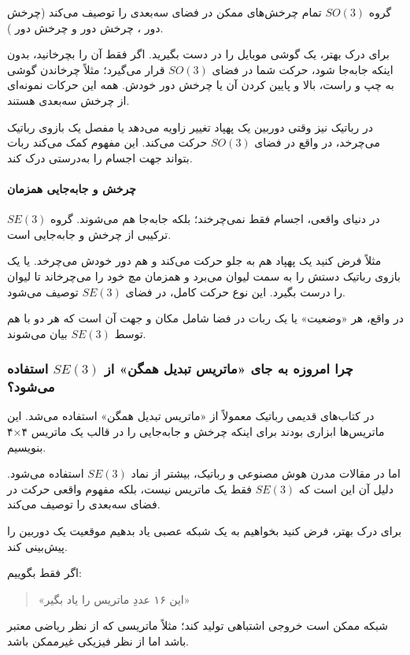 \documentclass{article}
\begin{document}
گروه $SO(3)$ تمام چرخش‌های ممکن در فضای سه‌بعدی را توصیف می‌کند (چرخش دور ، چرخش دور  و چرخش دور ).

برای درک بهتر، یک گوشی موبایل را در دست بگیرید. اگر فقط آن را بچرخانید، بدون اینکه جابه‌جا شود، حرکت شما در فضای $SO(3)$ قرار می‌گیرد؛ مثلاً چرخاندن گوشی به چپ و راست، بالا و پایین کردن آن یا چرخش دور خودش. همه این حرکات نمونه‌ای از چرخش سه‌بعدی هستند.

در رباتیک نیز وقتی دوربین یک پهپاد تغییر زاویه می‌دهد یا مفصل یک بازوی رباتیک می‌چرخد، در واقع در فضای $SO(3)$ حرکت می‌کند. این مفهوم کمک می‌کند ربات بتواند جهت اجسام را به‌درستی درک کند.

\paragraph{چرخش و جابه‌جایی همزمان }

در دنیای واقعی، اجسام فقط نمی‌چرخند؛ بلکه جابه‌جا هم می‌شوند. گروه $SE(3)$ ترکیبی از چرخش  و جابه‌جایی  است.

مثلاً فرض کنید یک پهپاد هم به جلو حرکت می‌کند و هم دور خودش می‌چرخد. یا یک بازوی رباتیک دستش را به سمت لیوان می‌برد و همزمان مچ خود را می‌چرخاند تا لیوان را درست بگیرد. این نوع حرکت کامل، در فضای $SE(3)$ توصیف می‌شود.

در واقع، هر «وضعیت» یا  یک ربات در فضا شامل مکان و جهت آن است که هر دو با هم توسط $SE(3)$ بیان می‌شوند.

\subsubsection{چرا امروزه به جای «ماتریس تبدیل همگن» از $SE(3)$ استفاده می‌شود؟}

در کتاب‌های قدیمی رباتیک معمولاً از «ماتریس تبدیل همگن» استفاده می‌شد. این ماتریس‌ها ابزاری بودند برای اینکه چرخش و جابه‌جایی را در قالب یک ماتریس ۴×۴ بنویسیم.

اما در مقالات مدرن هوش مصنوعی و رباتیک، بیشتر از نماد $SE(3)$ استفاده می‌شود. دلیل آن این است که $SE(3)$ فقط یک ماتریس نیست، بلکه مفهوم واقعی حرکت در فضای سه‌بعدی را توصیف می‌کند.

برای درک بهتر، فرض کنید بخواهیم به یک شبکه عصبی یاد بدهیم موقعیت یک دوربین را پیش‌بینی کند.

اگر فقط بگوییم:
\begin{quote}
	«این ۱۶ عددِ ماتریس را یاد بگیر»
\end{quote}

شبکه ممکن است خروجی اشتباهی تولید کند؛ مثلاً ماتریسی که از نظر ریاضی معتبر باشد اما از نظر فیزیکی غیرممکن باشد.
\end{document}
